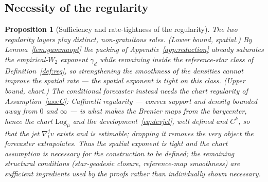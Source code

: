 \documentclass[11pt]{article}
\newtheorem{proposition}{Proposition}
\theoremstyle{definition}
\theoremstyle{remark}
\begin{document}
\subsection{Necessity of the regularity}\label{ssec:necessity}
\begin{proposition}[Sufficiency and rate-tightness of the regularity]\label{prop:necessity}
The two regularity layers play distinct, non-gratuitous roles. \emph{(Lower bound, spatial.)} By Lemma~\ref{lem:gammaopt}
the packing of Appendix~\ref{app:reduction} already saturates the empirical-$W_2$ exponent $\gamma_d$
while remaining inside the reference-star class of Definition~\ref{def:reg}, so strengthening the
smoothness of the densities cannot improve the spatial rate --- the \emph{spatial exponent is tight on
this class}. \emph{(Upper bound, chart.)} The conditional forecaster instead needs the
chart regularity of Assumption~\ref{ass:C}: Caffarelli regularity --- convex support and density
bounded away from $0$ and $\infty$ --- is what makes the Brenier maps from the barycenter, hence the
chart $\mathrm{Log}_{\bar\mu}$ and the development~\eqref{eq:devjet}, well defined and $C^k$, so that
the jet $\nabla_t^{j}v$ exists and is estimable; dropping it removes the very object the forecaster
extrapolates. Thus the spatial exponent is tight and the chart assumption is necessary for the
construction to be \emph{defined}; the remaining structural conditions (star-geodesic closure,
reference-map smoothness) are sufficient ingredients used by the proofs rather than individually
shown necessary.
\end{proposition}
\end{document}
